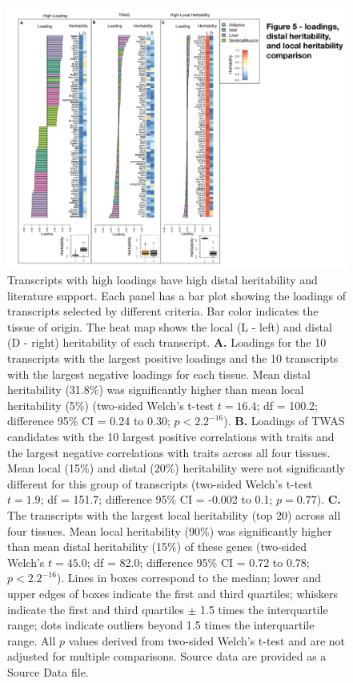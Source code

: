 \documentclass[
]{article}
\begin{document}
\begin{figure}[ht!]
\includegraphics[width=\textwidth]{Figures/Fig5_loading_heritability.pdf} 
\caption{Transcripts with high loadings have high distal heritability 
and literature support. Each panel has a bar plot showing 
the loadings of transcripts selected by different criteria. 
Bar color indicates the tissue of origin. The heat map 
shows the local (L - left) and distal (D - right) heritability 
of each transcript. \textbf{A.} Loadings for the 10 
transcripts with the largest positive loadings and the 10 
transcripts with the largest negative loadings for each tissue. 
Mean distal heritability (31.8\%) was significantly higher than 
mean local heritability (5\%) (two-sided Welch's 
t-test $t = 16.4$; df = 100.2; difference 95\% CI = 0.24 to 
0.30; $p < 2.2^{-16}$). \textbf{B.} Loadings of TWAS 
candidates with the 10 largest positive correlations with 
traits and the largest negative correlations with traits across 
all four tissues. Mean local (15\%) and distal (20\%) heritability
were not significantly different for this group of transcripts 
(two-sided Welch's t-test $t = 1.9$; df = 151.7; difference 95\% 
CI = -0.002 to 0.1; $p = 0.77$). \textbf{C.} The transcripts 
with the largest local heritability (top 20) across all four 
tissues. Mean local heritability (90\%) was significantly higher 
than mean distal heritability (15\%) of these genes 
(two-sided Welch's $t = 45.0$; df = 82.0; difference 95\% 
CI = 0.72 to 0.78; $p < 2.2^{-16}$). Lines in boxes correspond 
to the median; lower and upper edges of boxes indicate the 
first and third quartiles; whiskers indicate the first and 
third quartiles $\pm$ 1.5 times the interquartile range; dots 
indicate outliers beyond 1.5 times the interquartile range. All 
$p$ values derived from two-sided Welch's t-test and are 
not adjusted for multiple comparisons. Source data are 
provided as a Source Data file.
}
\label{fig:loading_heritability}
\end{figure}
\end{document}
